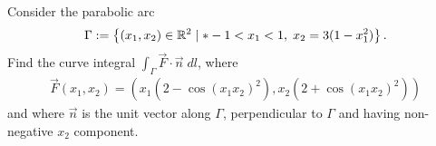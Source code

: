 \documentclass[11pt]{article}
\begin{document}
\begin{exercise}
    Consider the parabolic arc 
    \begin{gather*}
        \Gamma := \left\{ (x_{1},x_{2}) \in \bbR^{2} \suchthat* -1 < x_{1} < 1, \; x_{2} = 3 ( 1 - x_{1}^2 ) \right\}.
    \end{gather*}
    Find the curve integral $\int_\Gamma \vec F \cdot \vec{n} \;dl$, where 
    \begin{gather*}
        \vec F(x_{1},x_{2}) 
        = 
        \left( 
            x_{1} ( 2 - \cos(x_{1}x_{2})^{2} )
            , 
            x_{2} ( 2 + \cos(x_{1}x_{2})^{2} ) 
        \right)
    \end{gather*}
    and where $\vec{n}$ is the unit vector along $\Gamma$, perpendicular to $\Gamma$ and having non-negative $x_{2}$ component.
\end{exercise}
\end{document}

